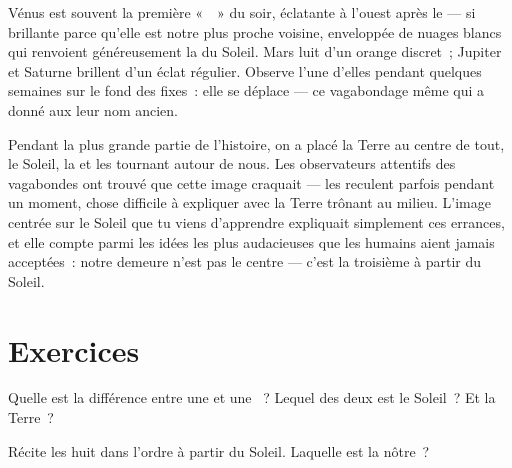 \begin{example}\label{ex:g4:solar-system:wanderers}
Vénus est souvent la première «~~» du soir, éclatante à l'ouest
après le  --- si brillante parce qu'elle est notre
plus proche voisine, enveloppée de nuages blancs qui renvoient
généreusement la  du Soleil. Mars luit d'un orange discret~;
Jupiter et Saturne brillent d'un éclat régulier. Observe l'une
d'elles pendant quelques semaines sur le fond des  fixes~:
elle se déplace --- ce vagabondage même qui a donné aux  leur
nom ancien.
\end{example}

\begin{remark}\label{rem:g4:solar-system:history}
Pendant la plus grande partie de l'histoire, on a placé la Terre au
centre de tout, le Soleil, la  et les  tournant autour de
nous. Les observateurs attentifs des vagabondes ont trouvé que cette
image craquait --- les  reculent parfois pendant un moment,
chose difficile à expliquer avec la Terre trônant au milieu. L'image
centrée sur le Soleil que tu viens d'apprendre expliquait simplement
ces errances, et elle compte parmi les idées les plus audacieuses que
les humains aient jamais acceptées~: notre demeure n'est pas le
centre --- c'est la troisième  à partir du Soleil.
\end{remark}

\section{Exercices}

\begin{exercise}[$\star$]\label{exo:g4:solar-system:1}
Quelle est la différence entre une  et une ~? Lequel des
deux est le Soleil~? Et la Terre~?
\end{exercise}

\begin{exercise}[$\star$]\label{exo:g4:solar-system:2}
Récite les huit  dans l'ordre à partir du Soleil. Laquelle
est la nôtre~?
\end{exercise}

